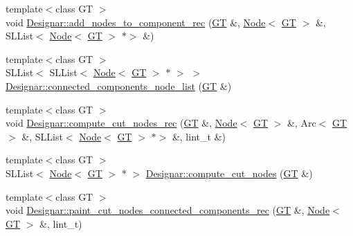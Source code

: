 \begin{DoxyCompactItemize}
\item 
{\footnotesize template$<$class GT $>$ }\\void \hyperlink{namespace_designar_acdd8c35a3d5633b9b97524010dcee4eb}{Designar\+::add\+\_\+nodes\+\_\+to\+\_\+component\+\_\+rec} (\hyperlink{demo-buildgraph_8_c_a3001c40d2c31ca87ed96cd7d1334a55e}{GT} \&, \hyperlink{test-mtreenode_8_c_a17a24b0725f59987143c5faf63c4dc6f}{Node}$<$ \hyperlink{demo-buildgraph_8_c_a3001c40d2c31ca87ed96cd7d1334a55e}{GT} $>$ \&, S\+L\+List$<$ \hyperlink{test-mtreenode_8_c_a17a24b0725f59987143c5faf63c4dc6f}{Node}$<$ \hyperlink{demo-buildgraph_8_c_a3001c40d2c31ca87ed96cd7d1334a55e}{GT} $>$ $\ast$$>$ \&)
\item 
{\footnotesize template$<$class GT $>$ }\\S\+L\+List$<$ S\+L\+List$<$ \hyperlink{test-mtreenode_8_c_a17a24b0725f59987143c5faf63c4dc6f}{Node}$<$ \hyperlink{demo-buildgraph_8_c_a3001c40d2c31ca87ed96cd7d1334a55e}{GT} $>$ $\ast$ $>$ $>$ \hyperlink{namespace_designar_a8b65b45b1581bbf5b74899490a8b8c61}{Designar\+::connected\+\_\+components\+\_\+node\+\_\+list} (\hyperlink{demo-buildgraph_8_c_a3001c40d2c31ca87ed96cd7d1334a55e}{GT} \&)
\item 
{\footnotesize template$<$class GT $>$ }\\void \hyperlink{namespace_designar_ac547a8b8e0e7a9a8ead8899c02b42128}{Designar\+::compute\+\_\+cut\+\_\+nodes\+\_\+rec} (\hyperlink{demo-buildgraph_8_c_a3001c40d2c31ca87ed96cd7d1334a55e}{GT} \&, \hyperlink{test-mtreenode_8_c_a17a24b0725f59987143c5faf63c4dc6f}{Node}$<$ \hyperlink{demo-buildgraph_8_c_a3001c40d2c31ca87ed96cd7d1334a55e}{GT} $>$ \&, Arc$<$ \hyperlink{demo-buildgraph_8_c_a3001c40d2c31ca87ed96cd7d1334a55e}{GT} $>$ \&, S\+L\+List$<$ \hyperlink{test-mtreenode_8_c_a17a24b0725f59987143c5faf63c4dc6f}{Node}$<$ \hyperlink{demo-buildgraph_8_c_a3001c40d2c31ca87ed96cd7d1334a55e}{GT} $>$ $\ast$$>$ \&, lint\+\_\+t \&)
\item 
{\footnotesize template$<$class GT $>$ }\\S\+L\+List$<$ \hyperlink{test-mtreenode_8_c_a17a24b0725f59987143c5faf63c4dc6f}{Node}$<$ \hyperlink{demo-buildgraph_8_c_a3001c40d2c31ca87ed96cd7d1334a55e}{GT} $>$ $\ast$ $>$ \hyperlink{namespace_designar_a8e4bd28af32addb6683407d7e898de7b}{Designar\+::compute\+\_\+cut\+\_\+nodes} (\hyperlink{demo-buildgraph_8_c_a3001c40d2c31ca87ed96cd7d1334a55e}{GT} \&)
\item 
{\footnotesize template$<$class GT $>$ }\\void \hyperlink{namespace_designar_aba19bd6f648fd502d1dcbcc37d1edfda}{Designar\+::paint\+\_\+cut\+\_\+nodes\+\_\+connected\+\_\+components\+\_\+rec} (\hyperlink{demo-buildgraph_8_c_a3001c40d2c31ca87ed96cd7d1334a55e}{GT} \&, \hyperlink{test-mtreenode_8_c_a17a24b0725f59987143c5faf63c4dc6f}{Node}$<$ \hyperlink{demo-buildgraph_8_c_a3001c40d2c31ca87ed96cd7d1334a55e}{GT} $>$ \&, lint\+\_\+t)

\end{DoxyCompactItemize}
